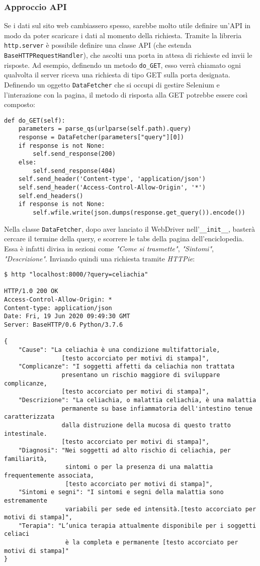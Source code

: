 \subsubsection{Approccio API}
Se i dati sul sito web cambiassero spesso, sarebbe molto utile definire un'API in modo da poter scaricare i dati al momento della richiesta. Tramite la libreria \texttt{http.server} è possibile definire una classe API (che estenda \texttt{BaseHTTPRequestHandler}), che ascolti una porta in attesa di richieste ed invii le risposte. Ad esempio, definendo un metodo \texttt{do\_GET}, esso verrà chiamato ogni qualvolta il server riceva una richiesta di tipo GET sulla porta designata. Definendo un oggetto \texttt{DataFetcher} che si occupi di gestire Selenium e l'interazione con la pagina, il metodo di risposta alla GET potrebbe essere così composto:
\begin{verbatim}
def do_GET(self):
    parameters = parse_qs(urlparse(self.path).query)
    response = DataFetcher(parameters["query"][0])
    if response is not None:
        self.send_response(200)
    else:
        self.send_response(404)
    self.send_header('Content-type', 'application/json')
    self.send_header('Access-Control-Allow-Origin', '*')
    self.end_headers()
    if response is not None:
        self.wfile.write(json.dumps(response.get_query()).encode())
\end{verbatim}
Nella classe \texttt{DataFetcher}, dopo aver lanciato il WebDriver nell'\texttt{\_\_init\_\_}, basterà cercare il termine della query, e scorrere le tabs della pagina dell'enciclopedia. Essa è infatti divisa in sezioni come \textit{"Come si trasmette"}, \textit{"Sintomi"}, \textit{"Descrizione"}. Inviando quindi una richiesta tramite \textit{HTTPie}:
\begin{verbatim}
$ http "localhost:8000/?query=celiachia"

HTTP/1.0 200 OK
Access-Control-Allow-Origin: *
Content-type: application/json
Date: Fri, 19 Jun 2020 09:49:30 GMT
Server: BaseHTTP/0.6 Python/3.7.6

{
    "Cause": "La celiachia è una condizione multifattoriale, 
                [testo accorciato per motivi di stampa]",
    "Complicanze": "I soggetti affetti da celiachia non trattata 
                presentano un rischio maggiore di sviluppare complicanze, 
                [testo accorciato per motivi di stampa]",
    "Descrizione": "La celiachia, o malattia celiachia, è una malattia 
                permanente su base infiammatoria dell'intestino tenue caratterizzata 
                dalla distruzione della mucosa di questo tratto intestinale.
                [testo accorciato per motivi di stampa]",
    "Diagnosi": "Nei soggetti ad alto rischio di celiachia, per familiarità,
                 sintomi o per la presenza di una malattia frequentemente associata, 
                 [testo accorciato per motivi di stampa]",
    "Sintomi e segni": "I sintomi e segni della malattia sono estremamente
                 variabili per sede ed intensità.[testo accorciato per motivi di stampa]",
    "Terapia": "L’unica terapia attualmente disponibile per i soggetti celiaci
                 è la completa e permanente [testo accorciato per motivi di stampa]"
}
\end{verbatim}
